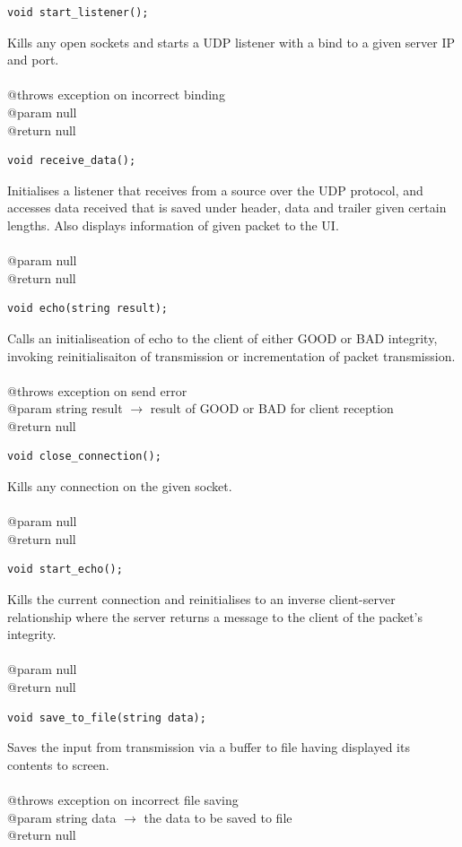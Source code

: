 \documentclass[12pt]{article}
\begin{document}
\begin{lstlisting}
void start_listener();
\end{lstlisting}
Kills any open sockets and starts a UDP listener with a bind to a given server IP and port.\\\\
@throws exception on incorrect binding\\
@param null\\
@return null

\begin{lstlisting}
void receive_data();
\end{lstlisting}
Initialises a listener that receives from a source over the UDP protocol, and accesses data received that is saved under header, data and trailer given certain lengths. Also displays information of given packet to the UI.\\\\
@param null\\
@return null

\begin{lstlisting}
void echo(string result);
\end{lstlisting}
Calls an initialiseation of echo to the client of either GOOD or BAD integrity, invoking reinitialisaiton of transmission or incrementation of packet transmission.\\\\
@throws exception on send error\\
@param string result $\rightarrow$ result of GOOD or BAD for client reception\\
@return null

\begin{lstlisting}
void close_connection();
\end{lstlisting}
Kills any connection on the given socket.\\\\
@param null\\
@return null

\begin{lstlisting}
void start_echo();
\end{lstlisting}
Kills the current connection and reinitialises to an inverse client-server relationship where the server returns a message to the client of the packet's integrity.\\\\
@param null\\
@return null

\begin{lstlisting}
void save_to_file(string data);
\end{lstlisting}
Saves the input from transmission via a buffer to file having displayed its contents to screen.\\\\
@throws exception on incorrect file saving\\
@param string data $\rightarrow$ the data to be saved to file\\
@return null
\end{document}
